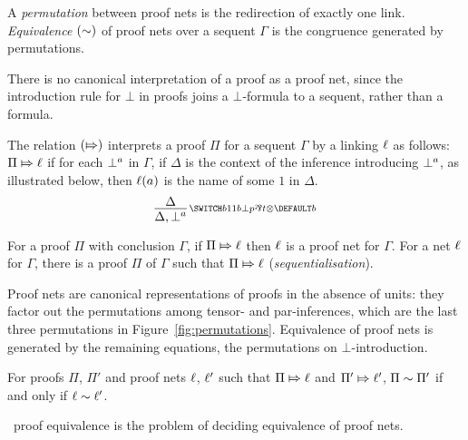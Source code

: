 \begin{definition}
\label{def:proof net equivalence}
%
A \emph{permutation} between proof nets is the redirection of exactly one link.
%
\emph{Equivalence} $(\sim)$ of proof nets over a sequent $\Gamma$ is the congruence generated by permutations.
%
\end{definition}


\noindent
There is no canonical interpretation of a proof as a proof net, since the introduction rule for $\bot$ in proofs joins a $\bot$-formula to a sequent, rather than a formula.



\begin{definition}
\label{def:proofs to nets}
%
The relation $(\Mapsto)$ interprets a proof $\Pi$ for a sequent $\Gamma$ by a linking $\ell$ as follows:
% 
$\Pi\Mapsto\ell$ if for each $\bot^{a}$ in $\Gamma$, if $\Delta$ is the context of the inference introducing $\bot^{a}$, as illustrated below, then $\ell(a)$ is the name of some $1$ in $\Delta$.
\[
	\infer[\MLLlabel b]{\Delta,\named a\bot}{\Delta}
\]
%
\end{definition}



\begin{proposition}
\label{prop:correctness and sequentialisation}
%
For a proof $\Pi$ with conclusion $\Gamma$, if $\Pi\Mapsto\ell$ then $\ell$ is a proof net for $\Gamma$.
%
For a net $\ell$ for $\Gamma$, there is a proof $\Pi$ of $\Gamma$ such that $\Pi\Mapsto\ell$ (\emph{sequentialisation}).
%
\end{proposition}


\noindent
Proof nets are canonical representations of proofs in the absence of units: they factor out the permutations among tensor- and par-inferences, which are the last three permutations in Figure~\ref{fig:permutations}.
%
Equivalence of proof nets is generated by the remaining equations, the permutations on $\bot$-introduction.



\begin{proposition}
\label{prop:proof nets work}
%
For proofs $\Pi$, $\Pi'$ and proof nets $\ell$, $\ell'$ such that $\Pi\Mapsto\ell$ and $\Pi'\Mapsto\ell'$, $\Pi\sim\Pi'$ if and only if $\ell\sim\ell'$.
%
\end{proposition}


\noindent
\MLL\ proof equivalence is the problem of deciding equivalence of proof nets.


